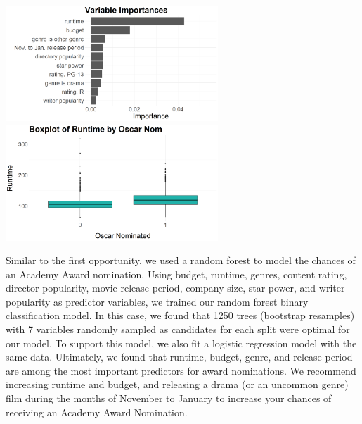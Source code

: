 \documentclass[10pt]{article}
\begin{document}
\begin{center}
\includegraphics[width=8cm]{_assets/predictive_analysis/variable_importance_rf_osc_nom.png}
\hspace{1cm}
\includegraphics[width=8cm]{_assets/_eda/runtime_on.png}
\end{center}

\quad Similar to the first opportunity, we used a random forest to model the chances of an Academy Award nomination. Using budget, runtime, genres, content rating, director popularity, movie release period, company size, star power, and writer popularity as predictor variables, we trained our random forest binary classification model. In this case, we found that 1250 trees (bootstrap resamples) with 7 variables randomly sampled as candidates for each split were optimal for our model. To support this model, we also fit a logistic regression model with the same data. Ultimately, we found that runtime, budget, genre, and release period are among the most important predictors for award nominations. We recommend increasing runtime and budget, and releasing a drama (or an uncommon genre) film during the months of November to January to increase your chances of receiving an Academy Award Nomination.
\end{document}
